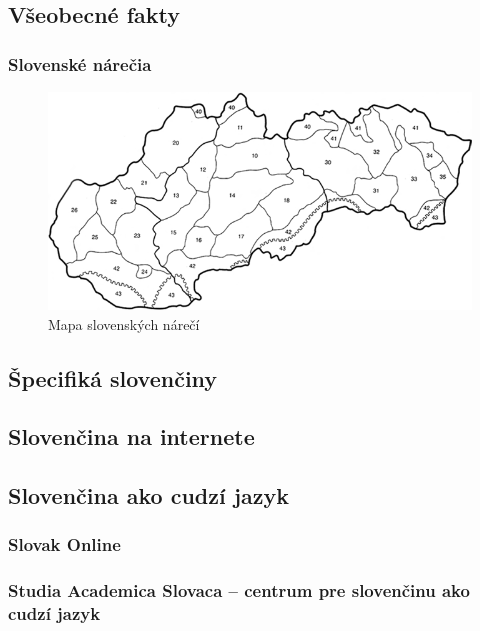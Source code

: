 \documentclass[]{../metanetpaper}
\begin{document}
\clearpage

\begin{multicols}{2}
\subsection{Všeobecné fakty}

\subsubsection{Slovenské nárečia}

\begin{figure}[ht]
\centering
\includegraphics[width=\textwidth]{dialects-map.png}
\caption{%
Mapa slovenských nárečí
}
\label{fig:dialects_sk}
\end{figure}


\subsection{Špecifiká slovenčiny}

\subsection{Slovenčina na internete}

\subsection{Slovenčina ako cudzí jazyk}
\subsubsection{Slovak Online}

\subsubsection{Studia Academica Slovaca – centrum pre slovenčinu ako cudzí jazyk}


\end{multicols}
\end{document}
